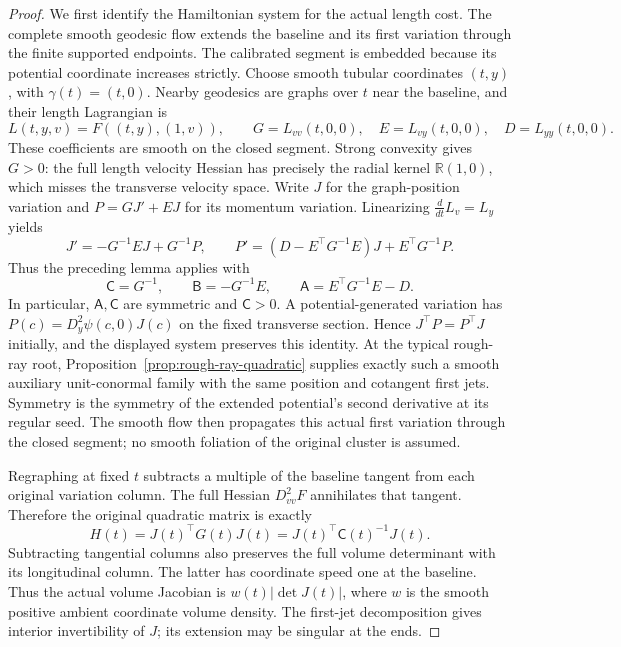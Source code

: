 \documentclass[11pt,reqno]{amsart}
\theoremstyle{definition}
\theoremstyle{remark}
\numberwithin{equation}{section}
\newcommand{\R}{\mathbb R}
\begin{document}
\begin{proof}
We first identify the Hamiltonian system for the actual length cost.
The complete smooth geodesic flow extends the baseline and its first
variation through the finite supported endpoints. The calibrated
segment is embedded because its potential coordinate increases
strictly. Choose smooth tubular coordinates \((t,y)\), with
\(\gamma(t)=(t,0)\). Nearby geodesics are graphs over \(t\) near the
baseline, and their length Lagrangian is
\[
 L(t,y,v)=F((t,y),(1,v)),\qquad
 G=L_{vv}(t,0,0),\quad E=L_{vy}(t,0,0),\quad D=L_{yy}(t,0,0).
\]
These coefficients are smooth on the closed segment. Strong convexity
gives \(G>0\): the full length velocity Hessian has precisely the
radial kernel \(\R(1,0)\), which misses the transverse velocity space.
Write \(J\) for the graph-position variation and
\(P=GJ'+EJ\) for its momentum variation. Linearizing
\(\frac{d}{dt}L_v=L_y\) yields
\[
 J'=-G^{-1}EJ+G^{-1}P,\qquad
 P'=(D-E^\top G^{-1}E)J+E^\top G^{-1}P.
\]
Thus the preceding lemma applies with
\[
 \mathsf C=G^{-1},\qquad \mathsf B=-G^{-1}E,\qquad
 \mathsf A=E^\top G^{-1}E-D.
\]
In particular, \(\mathsf A,\mathsf C\) are symmetric and
\(\mathsf C>0\). A potential-generated variation has
\(P(c)=D_y^2\psi(c,0)J(c)\) on the fixed transverse section.
Hence \(J^\top P=P^\top J\) initially, and the displayed system
preserves this identity. At the typical rough-ray root,
Proposition~\ref{prop:rough-ray-quadratic} supplies exactly such a
smooth auxiliary unit-conormal family with the same position and
cotangent first jets. Symmetry is the symmetry of the extended
potential's second derivative at its regular seed. The smooth flow
then propagates this actual first variation through the closed
segment; no smooth foliation of the original cluster is assumed.

Regraphing at fixed \(t\) subtracts a multiple of the baseline tangent
from each original variation column. The full Hessian \(D^2_{vv}F\)
annihilates that tangent. Therefore the original quadratic matrix is
exactly
\[
 H(t)=J(t)^\top G(t)J(t)=J(t)^\top\mathsf C(t)^{-1}J(t).
\]
Subtracting tangential columns also preserves the full volume
determinant with its longitudinal column. The latter has coordinate
speed one at the baseline. Thus the actual volume Jacobian is
\(w(t)|\det J(t)|\), where \(w\) is the smooth positive ambient
coordinate volume density. The first-jet decomposition gives interior
invertibility of \(J\); its extension may be singular at the ends.


\end{proof}
\end{document}

